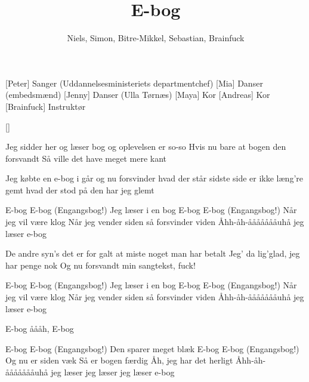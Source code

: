 \documentclass[a4paper,11pt]{article}
\title{E-bog}
\author{Niels, Simon, Bitre-Mikkel, Sebastian, Brainfuck}
\begin{document}
\maketitle

\begin{roles}
[Peter] Sanger (Uddannelsesministeriets departmentchef)
[Mia] Danser (embedsmænd)
[Jenny] Danser (Ulla Tørnæs)
[Maya] Kor
[Andreas] Kor
[Brainfuck] Instruktør
\end{roles}

\begin{props}
[]
\end{props}

\begin{song}

Jeg sidder her og læser bog
og oplevelsen er so-so
Hvis nu bare at bogen den forsvandt
Så ville det have meget mere kant

Jeg købte en e-bog i går
og nu forsvinder hvad der står
sidste side er ikke læng're gemt
hvad der stod på den har jeg glemt

E-bog E-bog (Engangsbog!)
Jeg læser i en bog
E-bog E-bog (Engangsbog!)
Når jeg vil være klog
Når jeg vender siden
så forsvinder viden
Åhh-åh-åååååååuhå
jeg læser e-bog


De andre syn's det er for galt
at miste noget man har betalt
Jeg' da lig'glad, jeg har penge nok
Og nu forsvandt min sangtekst, fuck! 

E-bog E-bog (Engangsbog!)
Jeg læser i en bog
E-bog E-bog (Engangsbog!)
Når jeg vil være klog
Når jeg vender siden
så forsvinder viden
Åhh-åh-åååååååuhå
jeg læser e-bog

E-bog åååh, E-bog

E-bog E-bog (Engangsbog!)
Den sparer meget blæk
E-bog E-bog (Engangsbog!)
Og nu er siden væk
Så er bogen færdig
Åh, jeg har det herligt
Åhh-åh-åååååååuhå
jeg læser
jeg læser
jeg læser e-bog
\end{song}
\end{document}
